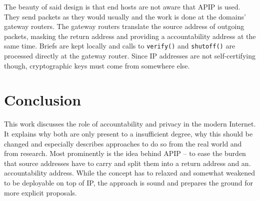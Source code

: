\documentclass{acm_proc_article-sp}
\begin{document}
The beauty of said design is that end hosts are not aware that APIP is used. They send packets as they would usually and the work is done at the domains' gateway routers. The gateway routers translate the source address of outgoing packets, masking the return address and providing a accountability address at the same time. Briefs are kept locally and calls to \texttt{verify()} and \texttt{shutoff()} are processed directly at the gateway router. Since IP addresses are not self-certifying though, cryptographic keys must come from somewhere else.


\section{Conclusion}
\label{sec:con}
This work discusses the role of accountability and privacy in the modern Internet. It explains why both are only present to a insufficient degree, why this should be changed and especially describes approaches to do so from the real world and from research. Most prominently is the idea behind APIP -- to ease the burden that source addresses have to carry and split them into a return address and an. accountability address. While the concept has to relaxed and somewhat weakened to be deployable on top of IP, the approach is sound and prepares the ground for more explicit proposals.

%

%
%
\balancecolumns
\end{document}
